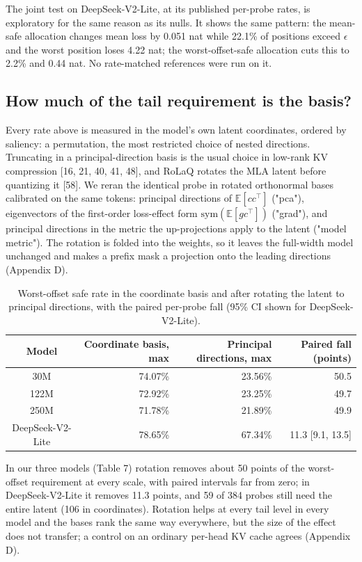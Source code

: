 \documentclass[11pt]{article}
\begin{document}
The joint test on DeepSeek-V2-Lite, at its published per-probe rates, is exploratory for the same reason as its nulls. It shows the same pattern: the mean-safe allocation changes mean loss by 0.051 nat while 22.1\% of positions exceed $\epsilon$ and the worst position loses 4.22 nat; the worst-offset-safe allocation cuts this to 2.2\% and 0.44 nat. No rate-matched references were run on it.

\subsection{How much of the tail requirement is the basis?}

Every rate above is measured in the model's own latent coordinates, ordered by saliency: a permutation, the most restricted choice of nested directions. Truncating in a principal-direction basis is the usual choice in low-rank KV compression [16, 21, 40, 41, 48], and RoLaQ rotates the MLA latent before quantizing it [58]. We reran the identical probe in rotated orthonormal bases calibrated on the same tokens: principal directions of $\mathbb E[cc^\top]$ ("pca"), eigenvectors of the first-order loss-effect form $\mathrm{sym}(\mathbb E[gc^\top])$ ("grad"), and principal directions in the metric the up-projections apply to the latent ("model metric"). The rotation is folded into the weights, so it leaves the full-width model unchanged and makes a prefix mask a projection onto the leading directions (Appendix D).

\begin{table}[t]
\centering
\caption{Worst-offset safe rate in the coordinate basis and after rotating the latent to principal directions, with the paired per-probe fall (95\% CI shown for DeepSeek-V2-Lite).}
\small
\begin{tabular}{crrr}
\toprule
Model & Coordinate basis, max & Principal directions, max & Paired fall (points) \\
\midrule
30M & 74.07\% & 23.56\% & 50.5 \\
122M & 72.92\% & 23.25\% & 49.7 \\
250M & 71.78\% & 21.89\% & 49.9 \\
DeepSeek-V2-Lite & 78.65\% & 67.34\% & 11.3 [9.1, 13.5] \\
\bottomrule
\end{tabular}
\end{table}

In our three models (Table 7) rotation removes about 50 points of the worst-offset requirement at every scale, with paired intervals far from zero; in DeepSeek-V2-Lite it removes 11.3 points, and 59 of 384 probes still need the entire latent (106 in coordinates). Rotation helps at every tail level in every model and the bases rank the same way everywhere, but the size of the effect does not transfer; a control on an ordinary per-head KV cache agrees (Appendix D).
\end{document}

